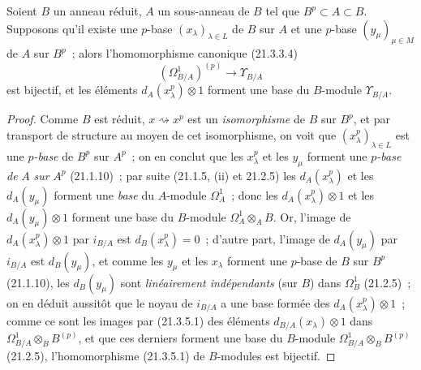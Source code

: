 \begin{proposition}[21.3.5]
\label{0.21.3.5-fr}
Soient $B$ un anneau réduit, $A$ un sous-anneau de $B$ tel que
$B^p\subset A\subset B$. Supposons qu'il existe une $p$-base
$(x_\lambda)_{\lambda\in L}$ de $B$ sur $A$ et une $p$-base
$(y_\mu)_{\mu\in M}$ de $A$ sur $B^p$~; alors l'homomorphisme canonique
(21.3.3.4)
\begin{equation}
\tag{21.3.5.1}\label{0.21.3.5.1-fr}
(\Omega^1_{B/A})^{(p)}\longrightarrow\Upsilon_{B/A}
\end{equation}
est bijectif, et les éléments $d_A(x_\lambda^p)\otimes1$ forment une base
du $B$-module $\Upsilon_{B/A}$.
\end{proposition}

\begin{proof}
Comme $B$ est réduit, $x\rightsquigarrow x^p$ est un \emph{isomorphisme} de
$B$ sur $B^p$, et par transport de structure au moyen de cet isomorphisme,
on voit que $(x_\lambda^p)_{\lambda\in L}$ est une \emph{$p$-base}
de $B^p$ sur $A^p$~; on en conclut que les $x_\lambda^p$ et les $y_\mu$ forment
une \emph{$p$-base de} $A$ \emph{sur} $A^p$ (21.1.10)~; par suite (21.1.5, (ii) et
21.2.5) les $d_A(x_\lambda^p)$ et les $d_A(y_\mu)$ forment une \emph{base} du
$A$-module $\Omega^1_A$~; donc les $d_A(x_\lambda^p)\otimes1$ et les $d_A(y_\mu)\otimes1$
forment une base du $B$-module $\Omega^1_A\otimes_A B$. Or, l'image de $d_A(x_\lambda^p)\otimes1$ par
$i_{B/A}$ est $d_B(x_\lambda^p)=0$~; d'autre part, l'image de $d_A(y_\mu)$
par $i_{B/A}$
est $d_B(y_\mu)$, et comme les $y_\mu$ et les $x_\lambda$
forment une $p$-base de $B$ sur $B^p$ (21.1.10), les $d_B(y_\mu)$ sont
\emph{linéairement indépendants} (sur $B$) dans $\Omega^1_B$ (21.2.5)~; on en déduit aussitôt
que le noyau de $i_{B/A}$ a une base formée des
$d_A(x_\lambda^p)\otimes1$~; comme ce sont les images par (21.3.5.1) des
éléments $d_{B/A}(x_\lambda)\otimes1$ dans $\Omega^1_{B/A}\otimes_B B^{(p)}$, et que ces derniers
forment une base du $B$-module $\Omega^1_{B/A}\otimes_B B^{(p)}$ (21.2.5),
l'homomorphisme (21.3.5.1) de $B$-modules est bijectif.
\end{proof}

